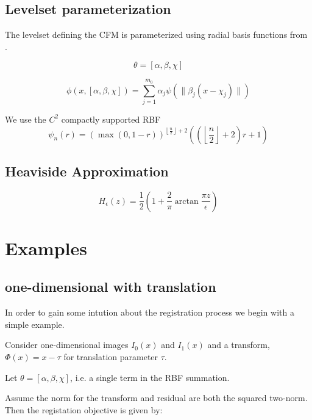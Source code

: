 \documentclass[]{article}
\begin{document}
\subsection{Levelset parameterization}
The levelset defining the CFM is parameterized using radial basis
functions from \cite{Aghasi2011}.

\begin{equation}
\theta = [\alpha, \beta, \chi]
\end{equation} 

\begin{equation}
\phi(x,[\alpha, \beta, \chi]) = \sum_{j = 1}^{m_0} \alpha_j
\psi(\|\beta_j(x - \chi_j)\|) 
\end{equation}

We use the \(C^2\) compactly supported RBF
\begin{equation}
\psi_{n}(r) = \left ( \max{\left ( 0,1 - r \right )} \right )^{\left\lfloor
  \frac{n}{2}\right\rfloor + 2}\left ( \left ( \left\lfloor
  \frac{n}{2}\right\rfloor + 2 \right ) r+1 \right ) 
\end{equation}

\subsection{Heaviside Approximation}

\begin{equation}
H_\epsilon(z) = \frac{1}{2} \left (  1 + \frac{2}{\pi}
  \arctan{\frac{\pi z}{\epsilon}} \right )
\end{equation}

\section{Examples}

\subsection{one-dimensional with translation }
In order to gain some intution about the registration process we begin
with a simple example.
\par
Consider one-dimensional images \(I_0(x)\) and \(I_1(x)\) and a
transform, \(\Phi(x) = x - \tau\) for translation parameter \(\tau\).
\par
Let \(\theta = [\alpha, \beta, \chi]\), i.e. a single term in the RBF
summation.
\par
Assume the norm for the transform and residual are both the squared two-norm.
Then the registation objective is given by:
\end{document}
